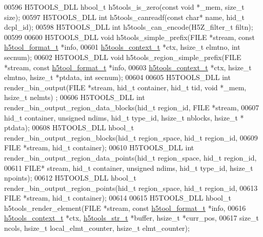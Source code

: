 \begin{DoxyCode}
{{{{{{{{{{{{{{{{{{{00596 H5TOOLS\_DLL hbool\_t h5tools\_is\_zero(\textcolor{keyword}{const} \textcolor{keywordtype}{void} *\_mem, \textcolor{keywordtype}{size\_t} size);
00597 H5TOOLS\_DLL \textcolor{keywordtype}{int}     h5tools\_canreadf(\textcolor{keyword}{const} \textcolor{keywordtype}{char}* name,  hid\_t dcpl\_id);
00598 H5TOOLS\_DLL \textcolor{keywordtype}{int}     h5tools\_can\_encode(H5Z\_filter\_t filtn);
00599 
00600 H5TOOLS\_DLL \textcolor{keywordtype}{void}    h5tools\_simple\_prefix(FILE *stream, \textcolor{keyword}{const} \hyperlink{structh5tool__format__t}{h5tool\_format\_t} *info,
00601                             \hyperlink{structh5tools__context__t}{h5tools\_context\_t} *ctx, hsize\_t elmtno, \textcolor{keywordtype}{int} secnum);
00602 H5TOOLS\_DLL \textcolor{keywordtype}{void}    h5tools\_region\_simple\_prefix(FILE *stream, \textcolor{keyword}{const} 
      \hyperlink{structh5tool__format__t}{h5tool\_format\_t} *info,
00603                             \hyperlink{structh5tools__context__t}{h5tools\_context\_t} *ctx, hsize\_t elmtno, hsize\_t *ptdata, \textcolor{keywordtype}{int} 
      secnum);
00604 
00605 H5TOOLS\_DLL \textcolor{keywordtype}{int}     render\_bin\_output(FILE *stream, hid\_t container, hid\_t tid, \textcolor{keywordtype}{void} *\_mem, hsize\_t nelmts)
      ;
00606 H5TOOLS\_DLL \textcolor{keywordtype}{int}     render\_bin\_output\_region\_data\_blocks(hid\_t region\_id, FILE *stream,
00607                             hid\_t container, \textcolor{keywordtype}{unsigned} ndims, hid\_t type\_id, hsize\_t nblocks, hsize\_t *
      ptdata);
00608 H5TOOLS\_DLL hbool\_t render\_bin\_output\_region\_blocks(hid\_t region\_space, hid\_t region\_id,
00609                              FILE *stream, hid\_t container);
00610 H5TOOLS\_DLL \textcolor{keywordtype}{int}     render\_bin\_output\_region\_data\_points(hid\_t region\_space, hid\_t region\_id,
00611                             FILE* stream, hid\_t container, \textcolor{keywordtype}{unsigned} ndims, hid\_t type\_id, hsize\_t npoints);
00612 H5TOOLS\_DLL hbool\_t render\_bin\_output\_region\_points(hid\_t region\_space, hid\_t region\_id,
00613                              FILE *stream, hid\_t container);
00614 
00615 H5TOOLS\_DLL hbool\_t h5tools\_render\_element(FILE *stream, \textcolor{keyword}{const} \hyperlink{structh5tool__format__t}{h5tool\_format\_t} *info,
00616                             \hyperlink{structh5tools__context__t}{h5tools\_context\_t} *ctx, 
      \hyperlink{structh5tools__str__t}{h5tools\_str\_t} *buffer, hsize\_t *curr\_pos,
00617                             \textcolor{keywordtype}{size\_t} ncols, hsize\_t local\_elmt\_counter, hsize\_t elmt\_counter);
}}}}}}}}}}}}}}}}}}}
\end{DoxyCode}
